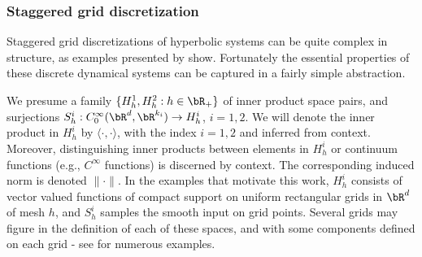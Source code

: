 
\subsubsection{Staggered grid discretization}
Staggered grid discretizations of hyperbolic systems can be quite
complex in structure, as examples presented by \cite{moczoetal:06}
show. Fortunately the essential properties of these discrete dynamical
systems can be captured in a fairly simple abstraction.

We presume a family $\{H^1_h, H^2_h: h \in \bR_+\}$ of inner product
space pairs, and surjections $S^i_h:
C_0^{\infty}(\bR^d,\bR^{k_i}) \rightarrow H^i_h$, $i=1,2$. We will
denote the inner product in $H^i_h$ by $\langle \cdot,\cdot\rangle$, 
with the index $i = 1,2$ and inferred from context. 
Moreover, distinguishing inner products between elements in
$H_h^i$ or continuum functions (e.g., $C^\infty$ functions) is discerned by context.
The corresponding induced norm is denoted $\|\cdot\|$.  
In the examples that motivate this work, $H^i_h$ consists of vector valued
functions of compact support on uniform rectangular grids in $\bR^d$ of mesh $h$, and $S^i_h$
samples the smooth input on grid points. Several
grids may figure in the definition of each of these spaces, and
with some components defined on each grid - see \cite{moczoetal:06}
for numerous examples.

